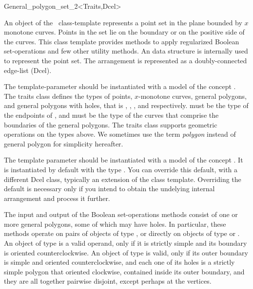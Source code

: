 \ccRefPageBegin

\begin{ccRefClass}{General_polygon_set_2<Traits,Dcel>}

\ccThreeToTwo
    
\ccDefinition
An object of the \ccClassTemplateName\ class-template represents a
point set in the plane bounded by $x$ monotone curves. Points in the set
lie on the boundary or on the positive side of the curves. This class 
template provides methods to apply regularized Boolean set-operations and 
few other utility methods. An  data structure is 
internally used to represent the point set. The arrangement is
represented as a doubly-connected edge-list ({\sc Dcel}).

The  template-parameter should be instantiated with a
model of the concept . The traits class
defines the types of points, $x$-monotone curves, general polygons,
and general polygons with holes, that is ,
, , and 
 respectively.  must 
be the type of the endpoints of , and 
 must be the type of the curves that comprise
the boundaries of the general polygons. The traits class supports geometric 
operations on the types above. We sometimes use the term {\em polygon} instead
of general polygon for simplicity hereafter.

The template parameter  should be instantiated with a
model of the concept . It is instantiated
by default with the type . You can override 
this default, with a different {\sc Dcel} class, typically an extension
of the  class template. Overriding the default is 
necessary only if you intend to obtain the undelying internal arrangement 
and process it further.

The input and output of the Boolean set-operations methods consist of one 
or more general polygons, some of which may have holes. In particular, 
these methods operate on pairs of objects of type \ccClassTemplateName, or
directly on objects of type  or 
. An object of type 
 is a valid operand, only if it is strictly simple 
and its boundary is oriented counterclockwise. An object of type
 is valid, only if 
 its outer boundary is simple and oriented counterclockwise, and each one of 
 its holes is a strictly simple polygon that oriented clockwise, contained inside its outer 
 boundary, and they are all together pairwise disjoint, except perhaps at the vertices.


\end{ccRefClass}
